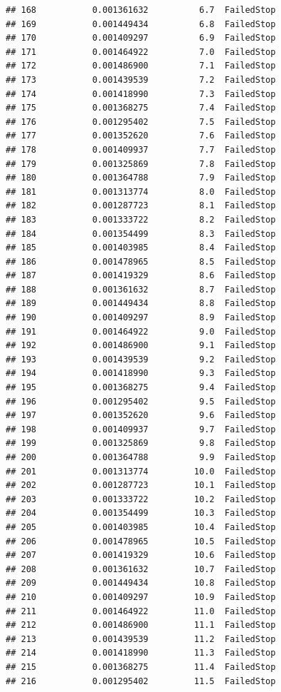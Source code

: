 \documentclass[
]{article}
\begin{document}
\begin{verbatim}
## 168           0.001361632          6.7  FailedStop
## 169           0.001449434          6.8  FailedStop
## 170           0.001409297          6.9  FailedStop
## 171           0.001464922          7.0  FailedStop
## 172           0.001486900          7.1  FailedStop
## 173           0.001439539          7.2  FailedStop
## 174           0.001418990          7.3  FailedStop
## 175           0.001368275          7.4  FailedStop
## 176           0.001295402          7.5  FailedStop
## 177           0.001352620          7.6  FailedStop
## 178           0.001409937          7.7  FailedStop
## 179           0.001325869          7.8  FailedStop
## 180           0.001364788          7.9  FailedStop
## 181           0.001313774          8.0  FailedStop
## 182           0.001287723          8.1  FailedStop
## 183           0.001333722          8.2  FailedStop
## 184           0.001354499          8.3  FailedStop
## 185           0.001403985          8.4  FailedStop
## 186           0.001478965          8.5  FailedStop
## 187           0.001419329          8.6  FailedStop
## 188           0.001361632          8.7  FailedStop
## 189           0.001449434          8.8  FailedStop
## 190           0.001409297          8.9  FailedStop
## 191           0.001464922          9.0  FailedStop
## 192           0.001486900          9.1  FailedStop
## 193           0.001439539          9.2  FailedStop
## 194           0.001418990          9.3  FailedStop
## 195           0.001368275          9.4  FailedStop
## 196           0.001295402          9.5  FailedStop
## 197           0.001352620          9.6  FailedStop
## 198           0.001409937          9.7  FailedStop
## 199           0.001325869          9.8  FailedStop
## 200           0.001364788          9.9  FailedStop
## 201           0.001313774         10.0  FailedStop
## 202           0.001287723         10.1  FailedStop
## 203           0.001333722         10.2  FailedStop
## 204           0.001354499         10.3  FailedStop
## 205           0.001403985         10.4  FailedStop
## 206           0.001478965         10.5  FailedStop
## 207           0.001419329         10.6  FailedStop
## 208           0.001361632         10.7  FailedStop
## 209           0.001449434         10.8  FailedStop
## 210           0.001409297         10.9  FailedStop
## 211           0.001464922         11.0  FailedStop
## 212           0.001486900         11.1  FailedStop
## 213           0.001439539         11.2  FailedStop
## 214           0.001418990         11.3  FailedStop
## 215           0.001368275         11.4  FailedStop
## 216           0.001295402         11.5  FailedStop

\end{verbatim}
\end{document}
